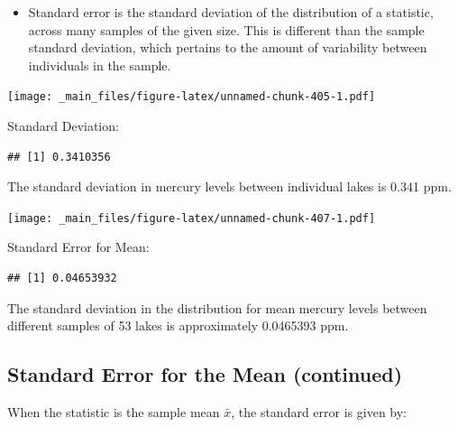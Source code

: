 \documentclass[]{book}
\newenvironment{Shaded}{\begin{snugshade}}{\end{snugshade}}
\newcommand{\KeywordTok}[1]{\textcolor[rgb]{0.13,0.29,0.53}{\textbf{#1}}}
\newcommand{\StringTok}[1]{\textcolor[rgb]{0.31,0.60,0.02}{#1}}
\newcommand{\OperatorTok}[1]{\textcolor[rgb]{0.81,0.36,0.00}{\textbf{#1}}}
\newcommand{\NormalTok}[1]{#1}
\providecommand{\tightlist}{%
  \setlength{\itemsep}{0pt}\setlength{\parskip}{0pt}}
\begin{document}
\begin{itemize}
\tightlist
\item
  Standard error is the standard deviation of the distribution of a
  statistic, across many samples of the given size. This is different
  than the sample standard deviation, which pertains to the amount of
  variability between individuals in the sample.
\end{itemize}

\texttt{[image: \_main\_files/figure-latex/unnamed-chunk-405-1.pdf]}

Standard Deviation:

\begin{Shaded}
\end{Shaded}

\begin{verbatim}
## [1] 0.3410356
\end{verbatim}

The standard deviation in mercury levels between individual lakes is
0.341 ppm.

\texttt{[image: \_main\_files/figure-latex/unnamed-chunk-407-1.pdf]}

Standard Error for Mean:

\begin{Shaded}
\end{Shaded}

\begin{verbatim}
## [1] 0.04653932
\end{verbatim}

The standard deviation in the distribution for mean mercury levels
between different samples of 53 lakes is approximately 0.0465393 ppm.

\subsection{Standard Error for the Mean
(continued)}\label{standard-error-for-the-mean-continued}

When the statistic is the sample mean \(\bar{x}\), the standard error is
given by:
\end{document}
